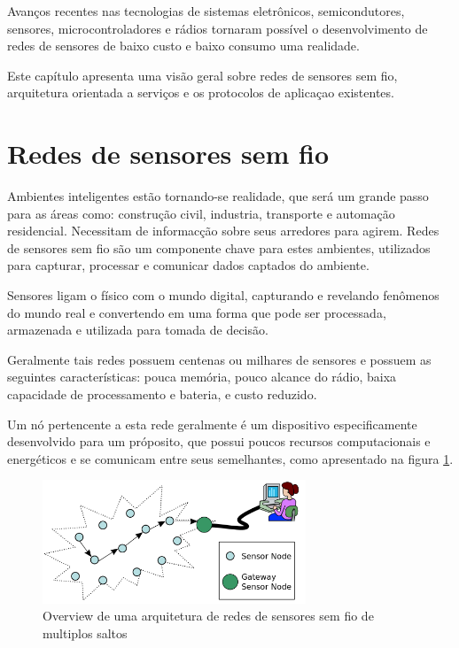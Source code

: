 Avan\c{c}os recentes nas tecnologias de sistemas eletr\^onicos, semicondutores, sensores, microcontroladores e r\'adios tornaram poss\'ivel o desenvolvimento de redes de sensores de baixo custo e baixo consumo uma realidade.

Este cap\'itulo apresenta uma vis\~ao geral sobre redes de sensores sem fio, arquitetura orientada a servi\c{c}os e os protocolos de aplica\c{c}ao existentes.

\section{Redes de sensores sem fio}

Ambientes inteligentes est\~ao tornando-se realidade,  que ser\'a um grande passo para as \'areas como: constru\c{c}\~ao civil, industria, transporte e automa\c{c}\~ao residencial. Necessitam de informac\c{c}\~ao sobre seus arredores para agirem. Redes de sensores sem fio s\~ao um componente chave para estes ambientes, utilizados para capturar, processar e comunicar dados captados do ambiente.\cite{lewis2004wireless}

Sensores ligam o f\'isico com o mundo digital, capturando e revelando fen\^omenos do mundo real e convertendo em uma forma que pode ser processada, armazenada e utilizada para tomada de decis\~ao. 

Geralmente tais redes possuem centenas ou milhares de sensores e possuem as seguintes caracter\'isticas: pouca mem\'oria, pouco alcance do r\'adio, baixa capacidade de processamento e bateria, e custo reduzido.

Um n\'o pertencente a esta rede geralmente \'e um dispositivo especificamente desenvolvido para um pr\'oposito, que possui poucos recursos computacionais e energ\'eticos e se comunicam entre seus semelhantes, como apresentado na figura \ref{wsnOverview}.
\begin{figure}[h]
   \label{wsnOverview}
   \centering
   \includegraphics[width=0.7\textwidth]{figuras/wsn.png}
   \caption{Overview de uma arquitetura de redes de sensores sem fio de multiplos saltos}
\end{figure}

